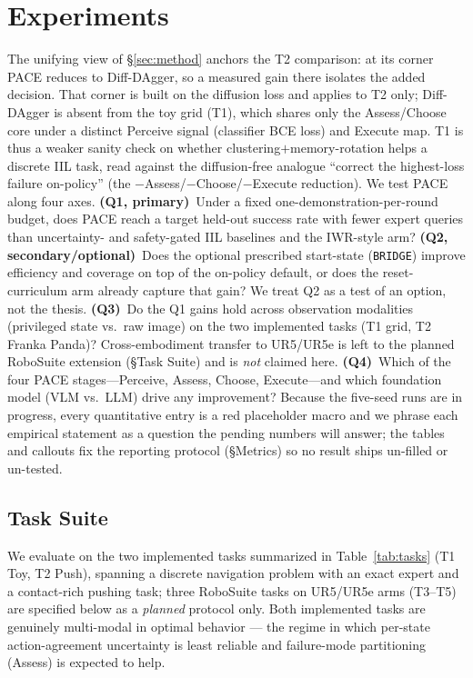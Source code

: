 \documentclass[letterpaper]{article} %
\begin{document}
\section{Experiments}

The unifying view of \S\ref{sec:method} anchors the T2 comparison: at its corner PACE
reduces to Diff-DAgger, so a measured gain there isolates the added decision. That
corner is built on the diffusion loss and applies to T2 only; Diff-DAgger is absent
from the toy grid (T1), which shares only the Assess/Choose core under a distinct
Perceive signal (classifier BCE loss) and Execute map. T1 is thus a weaker sanity
check on whether clustering$+$memory-rotation helps a discrete IIL task, read against
the diffusion-free analogue ``correct the highest-loss failure on-policy'' (the
$-$Assess/$-$Choose/$-$Execute reduction). We test PACE along four axes.
\textbf{(Q1, primary)}~Under a fixed one-demonstration-per-round budget, does PACE
reach a target held-out success rate with fewer expert queries than uncertainty- and
safety-gated IIL baselines and the IWR-style arm? \textbf{(Q2, secondary/optional)}~Does
the optional prescribed start-state (\texttt{BRIDGE}) improve efficiency and coverage
on top of the on-policy default, or does the reset-curriculum arm already capture that
gain? We treat Q2 as a test of an option, not the thesis. \textbf{(Q3)}~Do the Q1
gains hold across observation modalities (privileged state vs.\ raw image) on the two
implemented tasks (T1 grid, T2 Franka Panda)? Cross-embodiment transfer to UR5/UR5e is
left to the planned RoboSuite extension (\S Task Suite) and is \emph{not} claimed here.
\textbf{(Q4)}~Which of the four PACE stages---Perceive, Assess, Choose, Execute---and
which foundation model (VLM vs.\ LLM) drive any improvement? Because the five-seed
runs are in progress, every quantitative entry is a red placeholder macro and we
phrase each empirical statement as a question the pending numbers will answer; the
tables and callouts fix the reporting protocol (\S Metrics) so no result ships
un-filled or un-tested.

\subsection{Task Suite}

We evaluate on the two implemented tasks summarized in Table~\ref{tab:tasks} (T1
Toy, T2 Push), spanning a discrete navigation problem with an exact expert and a
contact-rich pushing task; three RoboSuite tasks on UR5/UR5e arms (T3--T5) are
specified below as a \emph{planned} protocol only. Both implemented tasks are
genuinely multi-modal in optimal behavior --- the regime in which per-state
action-agreement uncertainty is least reliable and failure-mode partitioning (Assess)
is expected to help.
\end{document}
